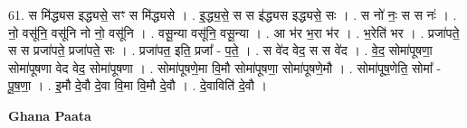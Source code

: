 \documentclass[17pt]{extarticle}
\begin{document}
61. स मि॑द्ध्यस इद्ध्यसे॒ सꣳ स मि॑द्ध्यसे । . इ॒द्ध्य॒से॒ स स इ॑द्ध्यस इद्ध्यसे॒ सः । . स नो॑ नः॒ स स नः॑ । . नो॒ वसू॑नि॒ वसू॑नि नो नो॒ वसू॑नि । . वसू॒न्या वसू॑नि॒ वसू॒न्या । . आ भ॑र भ॒रा भ॑र । . भ॒रेति॑ भर । . प्रजा॑पते॒ स स प्रजा॑पते॒ प्रजा॑पते॒ सः । . प्रजा॑पत॒ इति॒ प्रजा᳚ - प॒ते॒ । . स वे॑द वेद॒ स स वे॑द । . वे॒द॒ सोमा॑पूषणा॒ सोमा॑पूषणा वेद वेद॒ सोमा॑पूषणा । . सोमा॑पूषणे॒मा वि॒मौ सोमा॑पूषणा॒ सोमा॑पूषणे॒मौ । . सोमा॑पूष॒णेति॒ सोमा᳚ - पू॒ष॒णा॒ । . इ॒मौ दे॒वौ दे॒वा वि॒मा वि॒मौ दे॒वौ । . दे॒वाविति॑ दे॒वौ । \newline

\textbf{Ghana Paata } \newline
\end{document}
